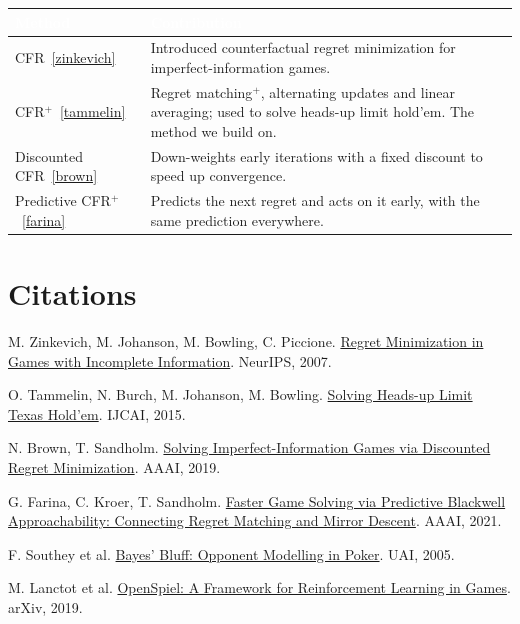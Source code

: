\documentclass{article}
\newcommand{\citep}[1]{\ref{#1}}
\newcommand{\tablestyle}{\renewcommand{\arraystretch}{1.35}\rowcolors{2}{shallowBlue}{white}\arrayrulecolor{deepBlue}}
\newcommand{\headrow}{\rowcolor{deepBlue}}
\newcommand{\hd}[1]{\textcolor{white}{\textbf{#1}}}
\begin{document}
\begin{center}
\tablestyle
\begin{tabularx}{0.9\linewidth}{|>{\raggedright\arraybackslash}p{3.6cm}|X|}
\hline
\headrow\hd{Method} & \hd{Contribution} \\ \hline
CFR~\citep{zinkevich}               & Introduced counterfactual regret minimization for imperfect-information games. \\ \hline
CFR$^+$~\citep{tammelin}            & Regret matching$^+$, alternating updates and linear averaging; used to solve heads-up limit hold'em. The method we build on. \\ \hline
Discounted CFR~\citep{brown}        & Down-weights early iterations with a fixed discount to speed up convergence. \\ \hline
Predictive CFR$^+$~\citep{farina}   & Predicts the next regret and acts on it early, with the same prediction everywhere. \\ \hline
\end{tabularx}
\end{center}

\section{Citations}

\begin{enumerate}[label={[\arabic*]}]
  \item \label{zinkevich}M. Zinkevich, M. Johanson, M. Bowling, C. Piccione.
        \href{https://poker.cs.ualberta.ca/publications/NIPS07-cfr.pdf}{Regret Minimization
        in Games with Incomplete Information}. NeurIPS, 2007.
  \item \label{tammelin}O. Tammelin, N. Burch, M. Johanson, M. Bowling.
        \href{https://webdocs.cs.ualberta.ca/~games/poker/publications/2015-ijcai-cfrplus.pdf}{Solving
        Heads-up Limit Texas Hold'em}. IJCAI, 2015.
  \item \label{brown}N. Brown, T. Sandholm.
        \href{https://arxiv.org/abs/1809.04040}{Solving Imperfect-Information Games via
        Discounted Regret Minimization}. AAAI, 2019.
  \item \label{farina}G. Farina, C. Kroer, T. Sandholm.
        \href{https://arxiv.org/abs/2007.14358}{Faster Game Solving via Predictive Blackwell
        Approachability: Connecting Regret Matching and Mirror Descent}. AAAI, 2021.
  \item \label{southey}F. Southey et al.
        \href{https://arxiv.org/abs/1207.1411}{Bayes' Bluff: Opponent Modelling in Poker}.
        UAI, 2005.
  \item \label{openspiel}M. Lanctot et al.
        \href{https://arxiv.org/abs/1908.09453}{OpenSpiel: A Framework for Reinforcement
        Learning in Games}. arXiv, 2019.
\end{enumerate}
\end{document}
